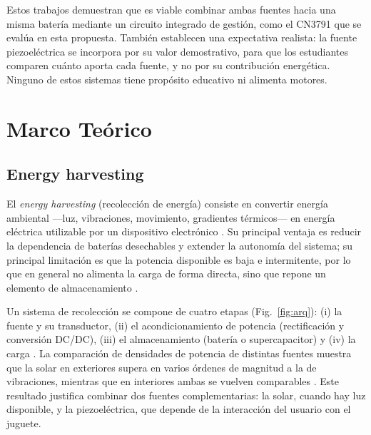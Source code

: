 \documentclass[11pt]{article}
\begin{document}
Estos trabajos demuestran que es viable combinar ambas
fuentes hacia una misma batería mediante un circuito integrado de gestión, como el
CN3791 que se evalúa en esta propuesta. También establecen una expectativa realista:
la fuente piezoeléctrica se incorpora por su valor demostrativo, para que los estudiantes
comparen cuánto aporta cada fuente, y no por su contribución energética. Ninguno de estos
sistemas tiene propósito educativo ni alimenta motores.
 
 
 




\newpage
\section{Marco Teórico}

\subsection{Energy harvesting}
El \emph{energy harvesting} (recolección de energía) consiste en convertir
energía ambiental —luz, vibraciones, movimiento, gradientes térmicos— en
energía eléctrica utilizable por un dispositivo electrónico
\cite{sudevalayam2011}. Su principal ventaja es reducir la dependencia de
baterías desechables y extender la autonomía del sistema; su principal
limitación es que la potencia disponible es baja e intermitente, por lo que
en general no alimenta la carga de forma directa, sino que repone un elemento
de almacenamiento \cite{knight2008}.
 
Un sistema de recolección se compone de cuatro etapas (Fig.~\ref{fig:arq}):
(i) la fuente y su transductor, (ii) el acondicionamiento de potencia
(rectificación y conversión DC/DC), (iii) el almacenamiento (batería o
supercapacitor) y (iv) la carga \cite{sudevalayam2011}. La comparación de
densidades de potencia de distintas fuentes muestra que la solar en exteriores
supera en varios órdenes de magnitud a la de vibraciones, mientras que en
interiores ambas se vuelven comparables \cite{roundy2003}. Este resultado
justifica combinar dos fuentes complementarias: la solar, cuando hay luz
disponible, y la piezoeléctrica, que depende de la interacción del usuario con
el juguete.
 
\end{document}
